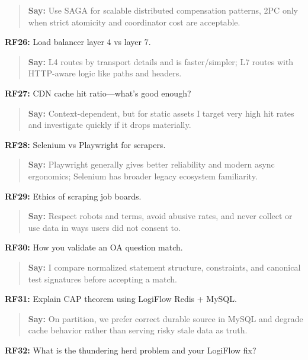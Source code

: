 \documentclass[9pt,a4paper]{article}
\begin{document}
\begin{quote}\small\textbf{Say:} Use SAGA for scalable distributed compensation patterns, 2PC only when strict atomicity and coordinator cost are acceptable.\end{quote}
\vspace{2mm}
\textbf{RF26:} Load balancer layer 4 vs layer 7.

\begin{quote}\small\textbf{Say:} L4 routes by transport details and is faster/simpler; L7 routes with HTTP-aware logic like paths and headers.\end{quote}
\vspace{2mm}
\textbf{RF27:} CDN cache hit ratio---what's good enough?

\begin{quote}\small\textbf{Say:} Context-dependent, but for static assets I target very high hit rates and investigate quickly if it drops materially.\end{quote}
\vspace{2mm}
\textbf{RF28:} Selenium vs Playwright for scrapers.

\begin{quote}\small\textbf{Say:} Playwright generally gives better reliability and modern async ergonomics; Selenium has broader legacy ecosystem familiarity.\end{quote}
\vspace{2mm}
\textbf{RF29:} Ethics of scraping job boards.

\begin{quote}\small\textbf{Say:} Respect robots and terms, avoid abusive rates, and never collect or use data in ways users did not consent to.\end{quote}
\vspace{2mm}
\textbf{RF30:} How you validate an OA question match.

\begin{quote}\small\textbf{Say:} I compare normalized statement structure, constraints, and canonical test signatures before accepting a match.\end{quote}
\vspace{2mm}
\textbf{RF31:} Explain CAP theorem using LogiFlow Redis + MySQL.

\begin{quote}\small\textbf{Say:} On partition, we prefer correct durable source in MySQL and degrade cache behavior rather than serving risky stale data as truth.\end{quote}
\vspace{2mm}
\textbf{RF32:} What is the thundering herd problem and your LogiFlow fix?
\end{document}
